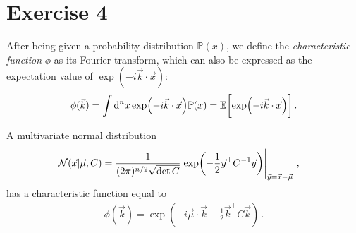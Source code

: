 \documentclass[main.tex]{subfiles}
\begin{document}
\section{Exercise 4}


After being given a probability distribution \(\mathbb{P}(x)\), we define the \emph{characteristic function} \(\phi \) as its Fourier transform, which can also be expressed as the expectation value of \(\exp(- i \vec{k} \cdot \vec{x})\): 
%
\begin{align}
\phi (\vec{k}) = \int \dd[n]{x} \exp(- i \vec{k} \cdot \vec{x}) \mathbb{P}(x) 
= \mathbb{E} \qty[ \exp(- i \vec{k} \cdot \vec{x})]
\,.
\end{align}

\begin{claim}
A multivariate normal distribution 
%
\begin{align}
\mathcal{N}(\vec{x} | \vec{\mu}, C)
&= \frac{1}{(2\pi )^{n/2} \sqrt{\det C}} \eval{\exp(- \frac{1}{2} \vec{y}^{\top} C^{-1} \vec{y})}_{\vec{y} = \vec{x} - \vec{\mu}}
\,,
\end{align}
%
has a characteristic function equal to 
%
\begin{align}
\phi (\vec{k}) = \exp(- i \vec{\mu}\cdot \vec{k} - \frac{1}{2} \vec{k}^{\top} C \vec{k}) 
\,.
\end{align}
\end{claim}
\end{document}

